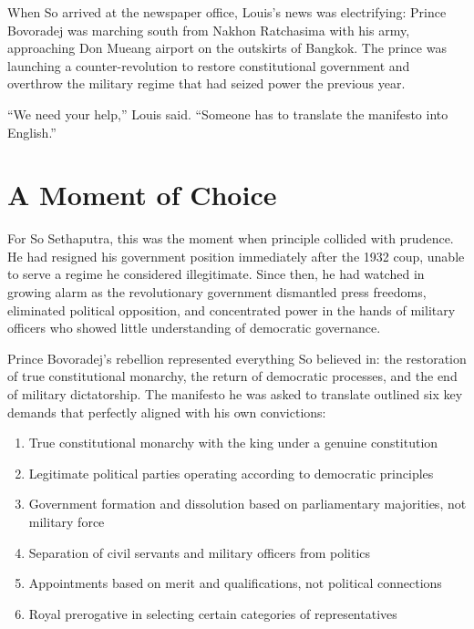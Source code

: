 \documentclass[
  Letterpaper,
]{scrbook}
\providecommand{\tightlist}{%
  \setlength{\itemsep}{0pt}\setlength{\parskip}{0pt}}
\begin{document}
When So arrived at the newspaper office, Louis's news was electrifying:
Prince Bovoradej was marching south from Nakhon Ratchasima with his
army, approaching Don Mueang airport on the outskirts of Bangkok. The
prince was launching a counter-revolution to restore constitutional
government and overthrow the military regime that had seized power the
previous year.

``We need your help,'' Louis said. ``Someone has to translate the
manifesto into English.''

\section{A Moment of Choice}\label{a-moment-of-choice}

For So Sethaputra, this was the moment when principle collided with
prudence. He had resigned his government position immediately after the
1932 coup, unable to serve a regime he considered illegitimate. Since
then, he had watched in growing alarm as the revolutionary government
dismantled press freedoms, eliminated political opposition, and
concentrated power in the hands of military officers who showed little
understanding of democratic governance.

Prince Bovoradej's rebellion represented everything So believed in: the
restoration of true constitutional monarchy, the return of democratic
processes, and the end of military dictatorship. The manifesto he was
asked to translate outlined six key demands that perfectly aligned with
his own convictions:

\begin{enumerate}
\def\labelenumi{\arabic{enumi}.}
\tightlist
\item
  True constitutional monarchy with the king under a genuine
  constitution
\item
  Legitimate political parties operating according to democratic
  principles\\
\item
  Government formation and dissolution based on parliamentary
  majorities, not military force
\item
  Separation of civil servants and military officers from politics
\item
  Appointments based on merit and qualifications, not political
  connections
\item
  Royal prerogative in selecting certain categories of representatives
\end{enumerate}
\end{document}
